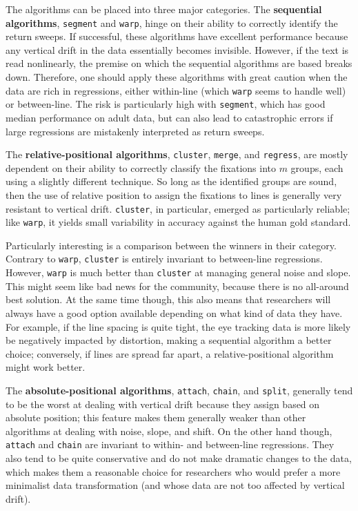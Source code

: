 \documentclass[doc,biblatex]{apa7}
\begin{document}
The algorithms can be placed into three major categories. The \textbf{sequential algorithms}, \texttt{segment} and \texttt{warp}, hinge on their ability to correctly identify the return sweeps. If successful, these algorithms have excellent performance because any vertical drift in the data essentially becomes invisible. However, if the text is read nonlinearly, the premise on which the sequential algorithms are based breaks down. Therefore, one should apply these algorithms with great caution when the data are rich in regressions, either within-line (which \texttt{warp} seems to handle well) or between-line. The risk is particularly high with \texttt{segment}, which has good median performance on adult data, but can also lead to catastrophic errors if large regressions are mistakenly interpreted as return sweeps.

The \textbf{relative-positional algorithms}, \texttt{cluster}, \texttt{merge}, and \texttt{regress}, are mostly dependent on their ability to correctly classify the fixations into $m$ groups, each using a slightly different technique. So long as the identified groups are sound, then the use of relative position to assign the fixations to lines is generally very resistant to vertical drift. \texttt{cluster}, in particular, emerged as particularly reliable; like \texttt{warp}, it yields small variability in accuracy against the human gold standard.

Particularly interesting is a comparison between the winners in their category. Contrary to \texttt{warp}, \texttt{cluster} is entirely invariant to between-line regressions. However, \texttt{warp} is much better than \texttt{cluster} at managing general noise and slope. This might seem like bad news for the community, because there is no all-around best solution. At the same time though, this also means that researchers will always have a good option available depending on what kind of data they have. For example, if the line spacing is quite tight, the eye tracking data is more likely be negatively impacted by distortion, making a sequential algorithm a better choice; conversely, if lines are spread far apart, a relative-positional algorithm might work better.

The \textbf{absolute-positional algorithms}, \texttt{attach}, \texttt{chain}, and \texttt{split}, generally tend to be the worst at dealing with vertical drift because they assign based on absolute position; this feature makes them generally weaker than other algorithms at dealing with noise, slope, and shift. On the other hand though, \texttt{attach} and \texttt{chain} are invariant to within- and between-line regressions. They also tend to be quite conservative and do not make dramatic changes to the data, which makes them a reasonable choice for researchers who would prefer a more minimalist data transformation (and whose data are not too affected by vertical drift).
\end{document}
